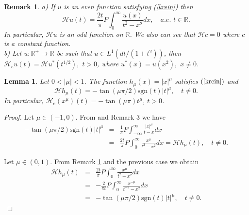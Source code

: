 \documentclass{amsart}
\newtheorem{lemma}[theorem]{Lemma}
\newtheorem{remark}[theorem]{Remark}
\newcommand{\R}{\mathbb{R}}
\newcommand{\INT}{\int_{-\infty}^{\infty}}
\begin{document}
\begin{remark}\label{even}
a) If $u$ is an even function satisfying (\ref{krein}) then
$$\mathcal{H}u(t)= \frac{2t}{\pi}P \int_0^\infty \frac{u(x)}{t^2-x^2}dx, \quad a.e. \,\, t\in \R.$$
In particular, $\mathcal{H}u$ is an odd function on $\R$. We also can see that $\mathcal{H}c=0$ where $c$ is a constant function.\\
b) Let $u:\R^+\rightarrow \R$ be such that $u\in L^1(dt/(1+t^2))$, then $\mathcal{H}_eu(t)=\mathcal{H}u^*(t^{1/2}),$ $t>0$, where $u^*(x)=u(x^2),$ $x\neq 0$.
\end{remark}

\begin{lemma}\label{hilpower}
Let $0<|\mu |<1$. The function $h_\mu(x)=|x|^\mu$ satisfies $(\ref{krein})$ and
\begin{equation}\label{Mu}
\mathcal{H}h_\mu(t)=-\tan(\mu\pi/2) \text{sgn}( t) |t|^\mu,\quad t\neq 0. 
\end{equation}
In particular, $\mathcal{H}_e(x^{\mu})(t)=-\tan(\mu\pi)t^\mu$, $t>0$.
\end{lemma}

\begin{proof} Let $\mu \in (-1,0)$. From \cite[Table 1.2, page 464]{King} and Remark 3 we have
\begin{eqnarray*}
-\tan(\mu\pi/2) \text{sgn}(t) |t|^{\mu}&=&\frac{1}{\pi}P\INT\frac{|x|^{\mu}}{t-x}dx\\
&=&\frac{2t}{\pi}P\int_0^\infty\frac{x^{\mu}}{t^2-x^2}dx=\mathcal{H}h_{\mu}(t), \quad t\neq 0.
\end{eqnarray*}

Let $\mu \in (0,1)$. From Remark \ref{even} and the previous case we obtain
\begin{eqnarray*}
\mathcal{H}h_\mu(t)&=&\frac{2t}{\pi}P \int_0^\infty \frac{x^{\mu}}{t^2-x^2}dx\\
&=&-\frac{2}{\pi t}P \int_0^\infty \frac{x^{-\mu}}{t^{-2}-x^2}dx\\
&=&-\tan(\mu\pi/2)\text{sgn}(t) |t|^\mu, \quad t \neq 0.
\end{eqnarray*}
\end{proof}
\end{document}
